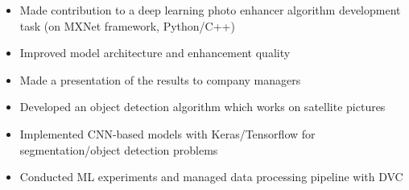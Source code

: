 \documentclass[10pt,a4paper,ragged2e]{altacv}
\begin{document}
\tagline{}

\begin{fullwidth}
\makecvheader
\end{fullwidth}




\begin{itemize}
	\item Made contribution to a deep learning photo enhancer algorithm development task (on MXNet framework, Python/C++)
	\item Improved model architecture and enhancement quality
	\item Made a presentation of the results to company managers
\end{itemize}
\divider

\begin{itemize}
	\item Developed an object detection algorithm which works on satellite pictures
	\item Implemented CNN-based models with Keras/Tensorflow for segmentation/object detection problems
	\item Conducted ML experiments and managed data processing pipeline with DVC
\end{itemize}
\end{document}
